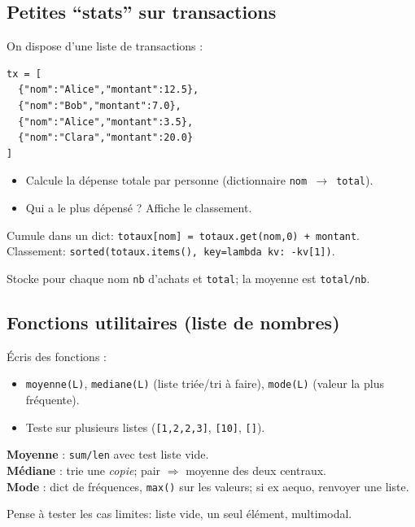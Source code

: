 \documentclass[11pt,a4paper]{article}
\begin{document}
\subsection*{Petites ``stats'' sur transactions}
On dispose d'une liste de transactions :
\begin{lstlisting}
tx = [
  {"nom":"Alice","montant":12.5},
  {"nom":"Bob","montant":7.0},
  {"nom":"Alice","montant":3.5},
  {"nom":"Clara","montant":20.0}
]
\end{lstlisting}
\begin{itemize}
    \item Calcule la dépense totale par personne (dictionnaire \texttt{nom $\rightarrow$ total}).
    \item Qui a le plus dépensé ? Affiche le classement.
\end{itemize}
\begin{tcolorbox}[title=Aide]
Cumule dans un dict: \texttt{totaux[nom] = totaux.get(nom,0) + montant}.\\
Classement: \texttt{sorted(totaux.items(), key=lambda kv: -kv[1])}.
\end{tcolorbox}
\begin{tcolorbox}[title=Bonus -- Aide]
Stocke pour chaque nom \texttt{nb} d'achats et \texttt{total}; la moyenne est \texttt{total/nb}.
\end{tcolorbox}

\subsection*{Fonctions utilitaires (liste de nombres)}
Écris des fonctions :
\begin{itemize}
    \item \texttt{moyenne(L)}, \texttt{mediane(L)} (liste triée/tri à faire), \texttt{mode(L)} (valeur la plus fréquente).
    \item Teste sur plusieurs listes (\texttt{[1,2,2,3]}, \texttt{[10]}, \texttt{[]}).
\end{itemize}
\begin{tcolorbox}[title=Aide]
\textbf{Moyenne} : \texttt{sum/len} avec test liste vide.\\
\textbf{Médiane} : trie une \emph{copie}; pair $\Rightarrow$ moyenne des deux centraux.\\
\textbf{Mode} : dict de fréquences, \texttt{max()} sur les valeurs; si ex aequo, renvoyer une liste.
\end{tcolorbox}
\begin{tcolorbox}[title=Bonus -- Aide]
Pense à tester les cas limites: liste vide, un seul élément, multimodal.
\end{tcolorbox}
\end{document}

